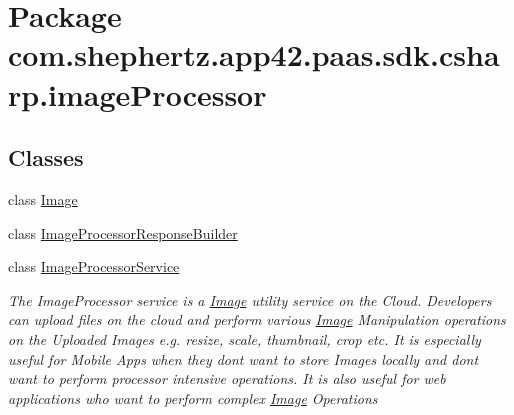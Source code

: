 \hypertarget{namespacecom_1_1shephertz_1_1app42_1_1paas_1_1sdk_1_1csharp_1_1image_processor}{\section{Package com.\+shephertz.\+app42.\+paas.\+sdk.\+csharp.\+image\+Processor}
\label{namespacecom_1_1shephertz_1_1app42_1_1paas_1_1sdk_1_1csharp_1_1image_processor}
}
\subsection*{Classes}
\begin{DoxyCompactItemize}
\item 
class \hyperlink{classcom_1_1shephertz_1_1app42_1_1paas_1_1sdk_1_1csharp_1_1image_processor_1_1_image}{Image}
\item 
class \hyperlink{classcom_1_1shephertz_1_1app42_1_1paas_1_1sdk_1_1csharp_1_1image_processor_1_1_image_processor_response_builder}{Image\+Processor\+Response\+Builder}
\item 
class \hyperlink{classcom_1_1shephertz_1_1app42_1_1paas_1_1sdk_1_1csharp_1_1image_processor_1_1_image_processor_service}{Image\+Processor\+Service}
\begin{DoxyCompactList}\small\item\em The Image\+Processor service is a \hyperlink{classcom_1_1shephertz_1_1app42_1_1paas_1_1sdk_1_1csharp_1_1image_processor_1_1_image}{Image} utility service on the Cloud. Developers can upload files on the cloud and perform various \hyperlink{classcom_1_1shephertz_1_1app42_1_1paas_1_1sdk_1_1csharp_1_1image_processor_1_1_image}{Image} Manipulation operations on the Uploaded Images e.\+g. resize, scale, thumbnail, crop etc. It is especially useful for Mobile Apps when they dont want to store Images locally and dont want to perform processor intensive operations. It is also useful for web applications who want to perform complex \hyperlink{classcom_1_1shephertz_1_1app42_1_1paas_1_1sdk_1_1csharp_1_1image_processor_1_1_image}{Image} Operations \end{DoxyCompactList}\end{DoxyCompactItemize}
